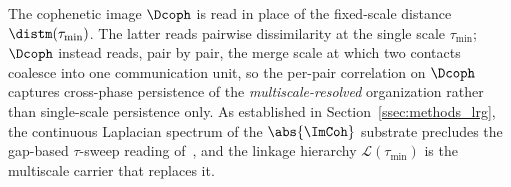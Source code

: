     The cophenetic image \(\Dcoph\) is read in place of the fixed-scale distance \(\distm(\tau_{\min})\). The latter reads pairwise dissimilarity at the single scale \(\tau_{\min}\); \(\Dcoph\) instead reads, pair by pair, the merge scale at which two contacts coalesce into one communication unit, so the per-pair correlation on \(\Dcoph\) captures cross-phase persistence of the \emph{multiscale-resolved} organization rather than single-scale persistence only. As established in Section~\ref{ssec:methods_lrg}, the continuous Laplacian spectrum of the \(\abs{\ImCoh}\) substrate precludes the gap-based \(\tau\)-sweep reading of~\cite{villegas2025multiscale}, and the linkage hierarchy \(\mathcal{L}(\tau_{\min})\) is the multiscale carrier that replaces it.


